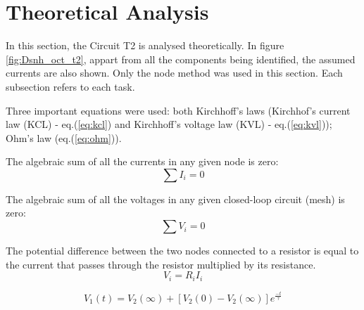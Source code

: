 
\section{Theoretical Analysis}
\label{sec:analysis}



In this section, the Circuit T2 is analysed theoretically. In figure \ref{fig:Dsnh_oct_t2},
appart from all the components being identified, the assumed currents are also shown.
Only the node method was used in this section. Each subsection refers to each task.


Three important equations were used: both Kirchhoff's laws (Kirchhof's current law (KCL)
- eq.(\ref{eq:kcl}) and Kirchhoff's voltage law (KVL) - eq.(\ref{eq:kvl})); Ohm's law
(eq.(\ref{eq:ohm})).

The algebraic sum of all the currents in any given node is zero:
\begin{equation}
	\sum I_i = 0
	\label{eq:kcl}
\end{equation}

The algebraic sum of all the voltages in any given closed-loop circuit (mesh) is zero:
\begin{equation}
	\sum V_i = 0
	\label{eq:kvl}
\end{equation}

The potential difference between the two nodes connected to a resistor is equal to the current that 
passes through the resistor multiplied by its resistance.
\begin{equation}
	V_i = R_iI_i
	\label{eq:ohm}
\end{equation}

\begin{equation}
	V_1(t) = V_2(\infty) + [V_2(0) - V_2(\infty)]e^{\frac{-t}{\tau}}
\end{equation}

\newpage

